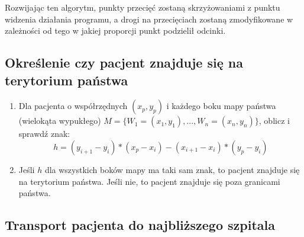 \documentclass[10pt,a4paper]{article}
\begin{document}
Rozwijając ten algorytm, punkty przecięć zostaną skrzyżowaniami z punktu widzenia działania programu, a drogi na przecięciach zostaną zmodyfikowane w zależności od tego w jakiej proporcji punkt podzielił odcinki.


\subsection{Określenie czy pacjent znajduje się na terytorium państwa}

\begin{enumerate}
    \item Dla pacjenta o współrzędnych $(x_p,y_p)$ i każdego boku mapy państwa (wielokąta wypukłego) $M=\{W_1=(x_1,y_1), ..., W_n=(x_n,y_n)\}$, oblicz i sprawdź znak:
    $$h=(y_{i+1}-y_i)*(x_p-x_i)-(x_{i+1}-x_i)*(y_p-y_i)$$
    \item Jeśli $h$ dla wszystkich boków mapy ma taki sam znak, to pacjent znajduje się na terytorium państwa. Jeśli nie, to pacjent znajduje się poza granicami państwa.
\end{enumerate}

\subsection{Transport pacjenta do najbliższego szpitala}
\end{document}
